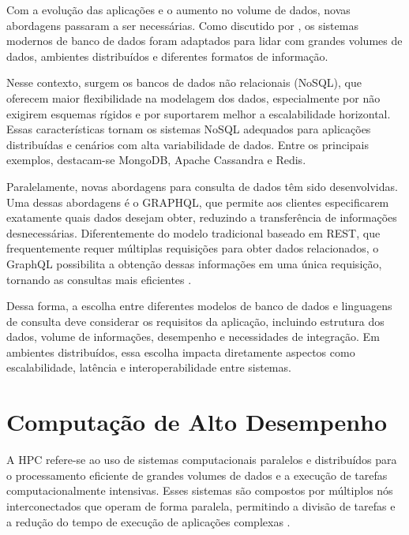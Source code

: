 Com a evolução das aplicações e o aumento no volume de dados, novas abordagens passaram a ser necessárias. Como discutido por \cite{elmasri2019}, os sistemas modernos de banco de dados foram adaptados para lidar com grandes volumes de dados, ambientes distribuídos e diferentes formatos de informação.

Nesse contexto, surgem os bancos de dados não relacionais (\gls{NoSQL}), que oferecem maior flexibilidade na modelagem dos dados, especialmente por não exigirem esquemas rígidos e por suportarem melhor a escalabilidade horizontal. Essas características tornam os sistemas NoSQL adequados para aplicações distribuídas e cenários com alta variabilidade de dados. Entre os principais exemplos, destacam-se MongoDB, Apache Cassandra e Redis.

Paralelamente, novas abordagens para consulta de dados têm sido desenvolvidas. Uma dessas abordagens é o \gls{GRAPHQL}, que permite aos clientes especificarem exatamente quais dados desejam obter, reduzindo a transferência de informações desnecessárias. Diferentemente do modelo tradicional baseado em \gls{REST}, que frequentemente requer múltiplas requisições para obter dados relacionados, o GraphQL possibilita a obtenção dessas informações em uma única requisição, tornando as consultas mais eficientes \cite{silveira2019}.

Dessa forma, a escolha entre diferentes modelos de banco de dados e linguagens de consulta deve considerar os requisitos da aplicação, incluindo estrutura dos dados, volume de informações, desempenho e necessidades de integração. Em ambientes distribuídos, essa escolha impacta diretamente aspectos como escalabilidade, latência e interoperabilidade entre sistemas.

\section{Computação de Alto Desempenho}

A \gls{HPC} refere-se ao uso de sistemas computacionais paralelos e distribuídos para o processamento eficiente de grandes volumes de dados e a execução de tarefas computacionalmente intensivas. Esses sistemas são compostos por múltiplos nós interconectados que operam de forma paralela, permitindo a divisão de tarefas e a redução do tempo de execução de aplicações complexas \cite{sterling2024}.

